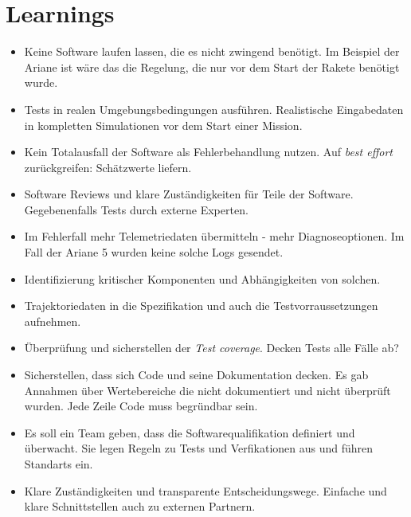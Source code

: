

\section{Learnings}

\begin{itemize}
	\item Keine Software laufen lassen, die es nicht zwingend benötigt. Im Beispiel der Ariane ist wäre das die Regelung, die nur vor dem Start der Rakete benötigt wurde.

	\item Tests in realen Umgebungsbedingungen ausführen. Realistische Eingabedaten in kompletten Simulationen vor dem Start einer Mission.

	\item Kein Totalausfall der Software als Fehlerbehandlung nutzen. Auf \textit{best effort} zurückgreifen: Schätzwerte liefern.

	\item Software Reviews und klare Zuständigkeiten für Teile der Software. Gegebenenfalls Tests durch externe Experten.

	\item Im Fehlerfall mehr Telemetriedaten übermitteln - mehr Diagnoseoptionen. Im Fall der Ariane 5 wurden keine solche Logs gesendet.

	\item Identifizierung kritischer Komponenten und Abhängigkeiten von solchen.

	\item Trajektoriedaten in die Spezifikation und auch die Testvorraussetzungen aufnehmen.

	\item Überprüfung und sicherstellen der \textit{Test coverage}. Decken Tests alle Fälle ab?

	\item Sicherstellen, dass sich Code und seine Dokumentation decken. Es gab Annahmen über Wertebereiche die nicht dokumentiert und nicht überprüft wurden. Jede Zeile Code muss begründbar sein.

	\item Es soll ein Team geben, dass die Softwarequalifikation definiert und überwacht. Sie legen Regeln zu Tests und Verfikationen aus und führen Standarts ein.

	\item Klare Zuständigkeiten und transparente Entscheidungswege. Einfache und klare Schnittstellen auch zu externen Partnern.

\end{itemize}
